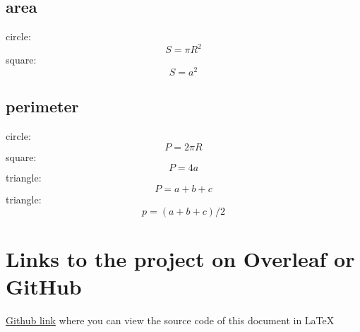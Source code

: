 \documentclass[12pt]{article}
\begin{document}
\subsection{area}
circle: $$S = \pi R^{2}$$
square: $$S = a^{2}$$

\subsection{perimeter}
circle: $$P = 2 \pi R$$
square: $$P = 4a$$
triangle: $$P = a + b + c$$
triangle: $$p = (a + b + c) / 2$$

\label{subsec:pythagoras}
\newpage
\section{Links to the project on Overleaf or GitHub}
\href{https://github.com/Vadimjus/Latex.git}{Github link} where you can view the source code of this document in LaTeX
\end{document}

